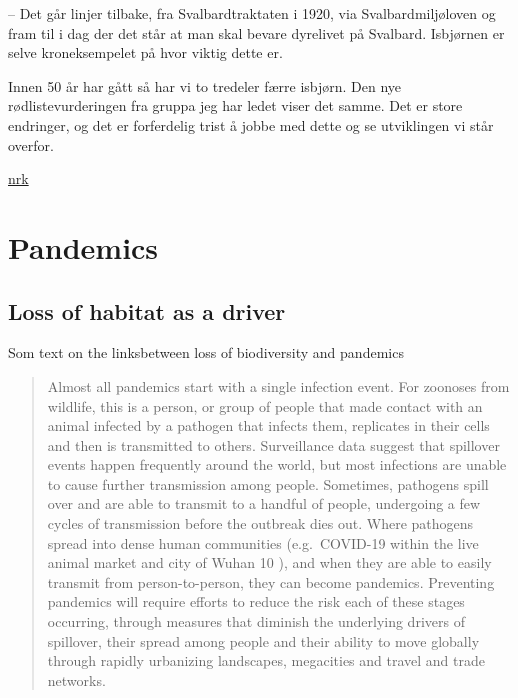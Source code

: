 \documentclass[
]{book}
\begin{document}
-- Det går linjer tilbake, fra Svalbardtraktaten i 1920, via Svalbardmiljøloven og fram til i dag der det står at man skal bevare dyrelivet på Svalbard. Isbjørnen er selve kroneksempelet på hvor viktig dette er.

Innen 50 år har gått så har vi to tredeler færre isbjørn. Den nye rødlistevurderingen fra gruppa jeg har ledet viser det samme. Det er store endringer, og det er forferdelig trist å jobbe med dette og se utviklingen vi står overfor.

\href{https://www.nrk.no/tromsogfinnmark/mener-isbjorn-kan-vaere-utryddet-pa-svalbard-om-50-ar-1.15559199}{nrk}

\hypertarget{pandemics}{%
\chapter{Pandemics}\label{pandemics}}

\hypertarget{loss-of-habitat-as-a-driver}{%
\section{Loss of habitat as a driver}\label{loss-of-habitat-as-a-driver}}

Som text on the linksbetween loss of biodiversity and pandemics

\begin{quote}
Almost all pandemics start with a single infection event. For zoonoses from wildlife, this is a person, or group of people that made contact with an animal infected by a pathogen that infects them, replicates in their cells and then is transmitted to others. Surveillance data suggest that spillover events happen frequently around the world, but most infections are unable to cause further transmission among people. Sometimes, pathogens spill over and are able to transmit to a handful of people, undergoing a few cycles of transmission before the outbreak dies out. Where pathogens spread into dense human communities (e.g.~COVID-19 within the live animal market and city of Wuhan 10 ), and when they are able to easily transmit from person-to-person, they can become pandemics. Preventing pandemics will require efforts to reduce the risk each of these stages occurring, through measures that diminish the underlying drivers of spillover, their spread among people and their ability to move globally through rapidly urbanizing landscapes, megacities and travel and trade networks.
\end{quote}
\end{document}
